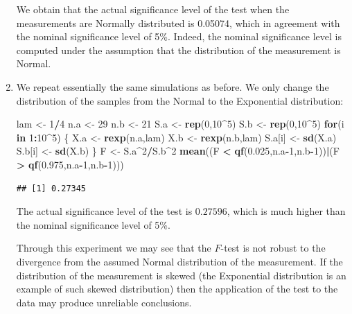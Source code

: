 \documentclass[]{krantz}
\makeatletter
\newenvironment{Shaded}{\begin{snugshade}}{\end{snugshade}}
\newcommand{\KeywordTok}[1]{\textcolor[rgb]{0.13,0.29,0.53}{\textbf{#1}}}
\newcommand{\DecValTok}[1]{\textcolor[rgb]{0.00,0.00,0.81}{#1}}
\newcommand{\FloatTok}[1]{\textcolor[rgb]{0.00,0.00,0.81}{#1}}
\newcommand{\StringTok}[1]{\textcolor[rgb]{0.31,0.60,0.02}{#1}}
\newcommand{\ControlFlowTok}[1]{\textcolor[rgb]{0.13,0.29,0.53}{\textbf{#1}}}
\newcommand{\OperatorTok}[1]{\textcolor[rgb]{0.81,0.36,0.00}{\textbf{#1}}}
\newcommand{\NormalTok}[1]{#1}
\newenvironment{kframe}{%
\medskip{}
\setlength{\fboxsep}{.8em}
 \def\at@end@of@kframe{}%
 \ifinner\ifhmode%
  \def\at@end@of@kframe{\end{minipage}}%
  \begin{minipage}{\columnwidth}%
 \fi\fi%
 \def\FrameCommand##1{\hskip\@totalleftmargin \hskip-\fboxsep
 \colorbox{shadecolor}{##1}\hskip-\fboxsep
     \hskip-\linewidth \hskip-\@totalleftmargin \hskip\columnwidth}%
 \MakeFramed {\advance\hsize-\width
   \@totalleftmargin\z@ \linewidth\hsize
   \@setminipage}}%
 {\par\unskip\endMakeFramed%
 \at@end@of@kframe}
\renewenvironment{Shaded}{\begin{kframe}}{\end{kframe}}
\theoremstyle{definition}
\theoremstyle{definition}
\theoremstyle{definition}
\theoremstyle{remark}
\makeatother
\begin{document}
\begin{enumerate}
  We obtain that the actual significance level of the test when the
  measurements are Normally distributed is 0.05074, which in agreement
  with the nominal significance level of 5\%. Indeed, the nominal
  significance level is computed under the assumption that the
  distribution of the measurement is Normal.
\item
  We repeat essentially the same simulations as before. We only change
  the distribution of the samples from the Normal to the Exponential
  distribution:

\begin{Shaded}
\begin{Highlighting}[]
\NormalTok{lam <-}\StringTok{ }\DecValTok{1}\OperatorTok{/}\DecValTok{4}
\NormalTok{n.a <-}\StringTok{ }\DecValTok{29}
\NormalTok{n.b <-}\StringTok{ }\DecValTok{21}
\NormalTok{S.a <-}\StringTok{ }\KeywordTok{rep}\NormalTok{(}\DecValTok{0}\NormalTok{,}\DecValTok{10}\OperatorTok{^}\DecValTok{5}\NormalTok{)}
\NormalTok{S.b <-}\StringTok{ }\KeywordTok{rep}\NormalTok{(}\DecValTok{0}\NormalTok{,}\DecValTok{10}\OperatorTok{^}\DecValTok{5}\NormalTok{)}
\ControlFlowTok{for}\NormalTok{(i }\ControlFlowTok{in} \DecValTok{1}\OperatorTok{:}\DecValTok{10}\OperatorTok{^}\DecValTok{5}\NormalTok{) \{}
\NormalTok{  X.a <-}\StringTok{ }\KeywordTok{rexp}\NormalTok{(n.a,lam)}
\NormalTok{  X.b <-}\StringTok{ }\KeywordTok{rexp}\NormalTok{(n.b,lam)}
\NormalTok{  S.a[i] <-}\StringTok{ }\KeywordTok{sd}\NormalTok{(X.a)}
\NormalTok{  S.b[i] <-}\StringTok{ }\KeywordTok{sd}\NormalTok{(X.b)}
\NormalTok{\}}
\NormalTok{F <-}\StringTok{ }\NormalTok{S.a}\OperatorTok{^}\DecValTok{2}\OperatorTok{/}\NormalTok{S.b}\OperatorTok{^}\DecValTok{2}
\KeywordTok{mean}\NormalTok{((F }\OperatorTok{<}\StringTok{ }\KeywordTok{qf}\NormalTok{(}\FloatTok{0.025}\NormalTok{,n.a}\OperatorTok{-}\DecValTok{1}\NormalTok{,n.b}\OperatorTok{-}\DecValTok{1}\NormalTok{))}\OperatorTok{|}\NormalTok{(F }\OperatorTok{>}\StringTok{ }\KeywordTok{qf}\NormalTok{(}\FloatTok{0.975}\NormalTok{,n.a}\OperatorTok{-}\DecValTok{1}\NormalTok{,n.b}\OperatorTok{-}\DecValTok{1}\NormalTok{)))}
\end{Highlighting}
\end{Shaded}

\begin{verbatim}
## [1] 0.27345
\end{verbatim}

  The actual significance level of the test is \(0.27596\), which is
  much higher than the nominal significance level of 5\%.

  Through this experiment we may see that the \(F\)-test is not robust
  to the divergence from the assumed Normal distribution of the
  measurement. If the distribution of the measurement is skewed (the
  Exponential distribution is an example of such skewed distribution)
  then the application of the test to the data may produce unreliable
  conclusions.
\end{enumerate}
\end{document}
